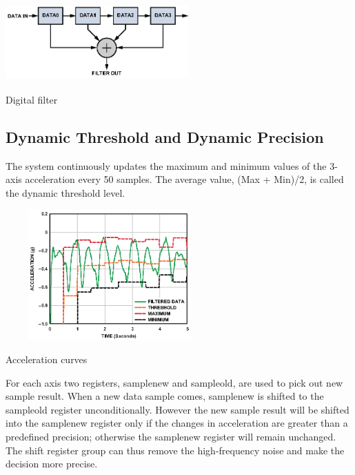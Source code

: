 \documentclass[a4paper,10pt]{article}
\makeatletter
\newenvironment{figurehere}{\def\@captype{figure}\vspace{2ex}}{\vspace{2ex}}
\makeatother
\begin{document}
\begin{multicols}{2}
\begin{figurehere}
 \centering
 \includegraphics[width=7cm, height=3cm]{./eps/DigitalFilter.eps}
 \caption{Digital filter}
 \label{fig:DigitalFilter}
\end{figurehere}

\subsection{Dynamic Threshold and Dynamic Precision}

The system continuously updates the maximum and minimum values of the 3-axis acceleration every 50 samples. The average value, (Max + Min)/2, is called the dynamic threshold level. 

\begin{figurehere}
 \centering
 \includegraphics[width=8cm, height=5cm]{./eps/Threshold.eps}
 \caption{Acceleration curves}
 \label{fig:Threshold}
\end{figurehere}

For each axis two registers, sample\textunderscore new and sample\textunderscore old, are used to pick out new sample result. When a new data sample comes, sample\textunderscore new is shifted to the sample\textunderscore old register unconditionally. However the new sample result will be shifted into the sample\textunderscore new register only if the changes in acceleration are greater than a predefined precision; otherwise the sample\textunderscore new register will remain unchanged. The shift register group can thus remove the high-frequency noise and make the decision more precise.


\end{multicols}
\end{document}
